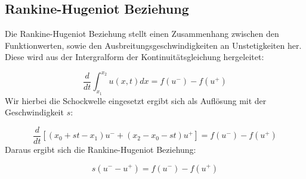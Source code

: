 \subsection{Rankine-Hugeniot Beziehung}
Die Rankine-Hugeniot Beziehung stellt einen Zusammenhang zwischen den Funktionwerten, sowie den Ausbreitungsgeschwindigkeiten an Unstetigkeiten her. Diese wird aus der Intergralform der Kontinuit\"atsgleichung hergeleitet:
\par
\begin{equation*}
	\frac{d}{dt}\int_{x_1}^{x_2} u(x,t)dx = f(u^-) - f(u^+)
\end{equation*}
Wir hierbei die Schockwelle eingesetzt ergibt sich als Aufl\"osung mit der Geschwindigkeit $s$:
\par
\begin{equation*}
	\frac{d}{dt}[(x_0 + st-x_1)u^- + (x_2-x_0-st)u^+] = f(u^-) - f(u^+)
\end{equation*}
Daraus ergibt sich die Rankine-Hugeniot Beziehung:
\par
\begin{equation*}
	s(u^- - u^+) = f(u^-) - f(u^+)
\end{equation*}

